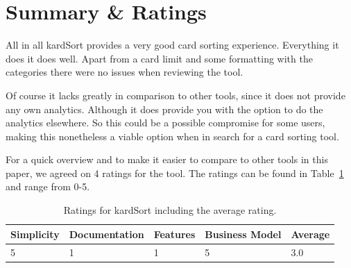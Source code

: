 \section{Summary \& Ratings}
All in all kardSort provides a very good card sorting experience. 
Everything it does it does well. Apart from a card limit and some 
formatting with the categories there were no issues when reviewing 
the tool.

Of course it lacks greatly in comparison to other tools, since it 
does not provide any own analytics. Although it does provide you
with the option to do the analytics elsewhere. So this could be a
possible compromise for some users, making this nonetheless a viable
option when in search for a card sorting tool.

For a quick overview and to make it easier to compare to other tools
in this paper, we agreed on 4 ratings for the tool. The ratings can be
found in Table~\ref{tab:rating-kardSort} and range from 0-5.

\begin{table}[tp] 
\centering 
\begin{tabularx}{\linewidth}{|X|X|X|X|X|}
\hline
Simplicity & Documentation & Features & Business Model & Average \\ 
\hline 
5 & 1 & 1 & 5 & 3.0 \\ 
\hline 
\end{tabularx} 
\caption[Ratings for kardSort] {
Ratings for kardSort including the average rating.
} 
\label{tab:rating-kardSort}
\end{table}